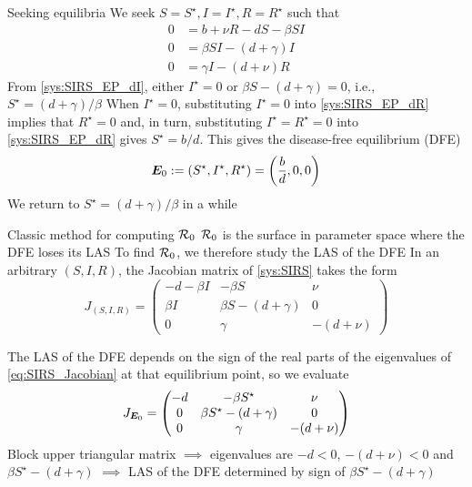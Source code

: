 \documentclass[aspectratio=169]{beamer}\usepackage[]{graphicx}\usepackage[]{xcolor}
\begin{document}
\begin{frame}{Seeking equilibria}
We seek $S=S^\star, I=I^\star, R=R^\star$ such that
\begin{subequations} \label{sys:SIRS_EP}
\begin{align}
0 &= b+\nu R-dS-\beta SI \label{sys:SIRS_EP_dS} \\
0 &= \beta SI-(d+\gamma) I \label{sys:SIRS_EP_dI} \\
0 &= \gamma I-(d+\nu)R \label{sys:SIRS_EP_dR}
\end{align}    
\end{subequations}
\vfill
From \eqref{sys:SIRS_EP_dI}, either $I^\star=0$ or $\beta S-(d+\gamma)=0$, i.e., $S^\star=(d+\gamma)/\beta$
\vfill
When $I^\star=0$, substituting $I^\star=0$ into \eqref{sys:SIRS_EP_dR} implies that $R^\star=0$ and, in turn, substituting $I^\star=R^\star=0$ into \eqref{sys:SIRS_EP_dR} gives $S^\star=b/d$. This gives the disease-free equilibrium (DFE)
\begin{equation}\label{eq:SIRS_DFE}
\bm{E}_0:=(S^\star,I^\star,R^\star)=
\left(\frac bd, 0, 0\right)
\end{equation}
\vfill
We return to $S^\star=(d+\gamma)/\beta$ in a while
\end{frame}



\begin{frame}{Classic method for computing $\mathcal{R}_0$}
$\mathcal{R}_0$ is the surface in parameter space where the DFE loses its LAS
\vfill
To find $\mathcal{R}_0$, we therefore study the LAS of the DFE
\vfill
In an arbitrary $(S,I,R)$, the Jacobian matrix of \eqref{sys:SIRS} takes the form
\begin{equation}
\label{eq:SIRS_Jacobian}
J_{(S,I,R)} =
\begin{pmatrix}
-d-\beta I & -\beta S & \nu \\
\beta I & \beta S-(d+\gamma) & 0 \\
0 & \gamma & -(d+\nu)
\end{pmatrix}
\end{equation}
\end{frame}

\begin{frame}
The LAS of the DFE depends on the sign of the real parts of the eigenvalues of \eqref{eq:SIRS_Jacobian} at that equilibrium point, so we evaluate
\begin{equation}
\label{eq:SIRS_Jacobian_DFE}
J_{\bm{E}_0} =
\begin{pmatrix}
-d & -\beta S^\star & \nu \\
0 & \beta S^\star-(d+\gamma) & 0 \\
0 & \gamma & -(d+\nu)
\end{pmatrix}
\end{equation}
\vfill
Block upper triangular matrix $\implies$ eigenvalues are $-d<0$, $-(d+\nu)<0$ and $\beta S^\star-(d+\gamma)$ 
\vfill
$\implies$ LAS of the DFE determined by sign of $\beta S^\star-(d+\gamma)$
\end{frame}
\end{document}
